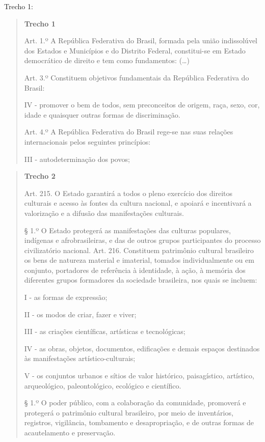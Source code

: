 {{Trecho 1:

\begin{quote}

\textbf{Trecho 1}

Art. 1.º A República Federativa do Brasil, formada pela união
indissolúvel dos Estados e Municípios e do Distrito Federal,
constitui-se em Estado democrático de direito e tem como fundamentos: (\ldots{})

Art. 3.º Constituem objetivos fundamentais da República Federativa do
Brasil:

IV - promover o bem de todos, sem preconceitos de origem, raça, sexo,
cor, idade e quaisquer outras formas de discriminação.

Art. 4.º A República Federativa do Brasil rege-se nas suas relações
internacionais pelos seguintes princípios:

III - autodeterminação dos povos;

\end{quote}


\begin{quote}
\textbf{Trecho 2}

Art. 215. O Estado garantirá a todos o pleno exercício dos direitos
culturais e acesso às fontes da cultura nacional, e apoiará e
incentivará a valorização e a difusão das manifestações culturais.

§ 1.º O Estado protegerá as manifestações das culturas populares,
indígenas e afrobrasileiras, e das de outros grupos participantes do
processo civilizatório nacional. Art. 216. Constituem patrimônio
cultural brasileiro os bens de natureza material e imaterial, tomados
individualmente ou em conjunto, portadores de referência à identidade, à
ação, à memória dos diferentes grupos formadores da sociedade
brasileira, nos quais se incluem:

I - as formas de expressão;

II - os modos de criar, fazer e viver;

III - as criações científicas, artísticas e tecnológicas;

IV - as obras, objetos, documentos, edificações e demais espaços
destinados às manifestações artístico-culturais;

V - os conjuntos urbanos e sítios de valor histórico, paisagístico,
artístico, arqueológico, paleontológico, ecológico e científico.

§ 1.º O poder público, com a colaboração da comunidade, promoverá e
protegerá o patrimônio cultural brasileiro, por meio de inventários,
registros, vigilância, tombamento e desapropriação, e de outras formas
de acautelamento e preservação. \\


\end{quote}}}
